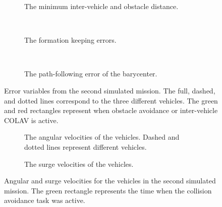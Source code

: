 \begin{figure}[htbp]
    \centering
    \begin{subfigure}[t]{.9\textwidth}
    \centering
    \setlength{}
    \setlength\figureheight{3cm}
    
    \vspace*{-2mm}
    \caption{The minimum inter-vehicle and obstacle distance.}
    \label{fig:collision_avoidance_IC}
    \end{subfigure}
    \\
    \begin{subfigure}[t]{.9\textwidth}
    \centering
    \setlength{}
    \setlength\figureheight{3.3cm}
    
    \vspace*{-2mm}
    \caption{The formation keeping errors. }
    \label{fig:formation_keeping_error_IC}
    \end{subfigure}
    \\
    \begin{subfigure}[t]{.9\textwidth}
    \centering
    \setlength{}
    \setlength\figureheight{3cm}
    
    \vspace*{-2mm}
    \caption{The path-following error of the barycenter.}
    \label{fig:path_following_error_IC}
    \end{subfigure}
    \vspace*{-2mm}
    \caption{Error variables from the second simulated mission. The full, dashed, and dotted lines correspond to the three different vehicles. The green and red rectangles represent when obstacle avoidance or inter-vehicle COLAV is active.}
    \label{fig:sim_results_IC}
\end{figure}

\begin{figure}[htbp]
    \centering
    \begin{subfigure}[t]{\textwidth}
    \centering
    \setlength{}
    \setlength\figureheight{4cm}
    
    \caption{The angular velocities of the vehicles. Dashed and dotted lines represent different vehicles.}
    \label{fig:angular_velocities_IC}
    \end{subfigure}
    \begin{subfigure}[t]{\textwidth}
    \centering
    \setlength{}
    \setlength\figureheight{4cm}
    
    \caption{The surge velocities of the vehicles.}
    \label{fig:surge_velocities_IC}
    \end{subfigure}
    \caption{Angular and surge velocities for the vehicles in the second simulated mission. The green rectangle represents the time when the collision avoidance task was active.}
    \label{fig:velocities_IC}
\end{figure}

